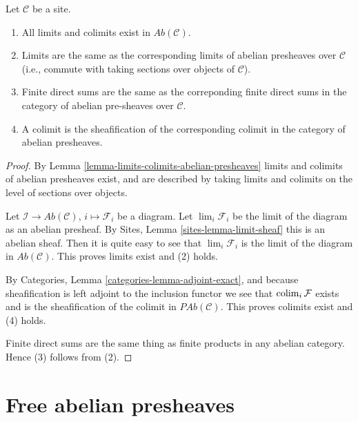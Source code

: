 \begin{lemma}
\label{lemma-limits-colimits-abelian-sheaves}
Let $\mathcal{C}$ be a site.
\begin{enumerate}
\item All limits and colimits exist in $\textit{Ab}(\mathcal{C})$.
\item Limits are the same as the corresponding limits of abelian presheaves
over $\mathcal{C}$ (i.e., commute with taking sections over objects of
$\mathcal{C}$).
\item Finite direct sums are the same as the correponding finite direct sums
in the category of abelian pre-sheaves over $\mathcal{C}$.
\item A colimit is the sheafification of the corresponding colimit in
the category of abelian presheaves.
\end{enumerate}
\end{lemma}

\begin{proof}
By Lemma \ref{lemma-limits-colimits-abelian-presheaves} limits and colimits
of abelian presheaves exist, and are described by taking limits and colimits
on the level of sections over objects.

\medskip\noindent
Let $\mathcal{I} \to \textit{Ab}(\mathcal{C})$, $i \mapsto \mathcal{F}_i$
be a diagram. Let $\lim_i \mathcal{F}_i$ be the limit of the diagram
as an abelian presheaf. By Sites, Lemma \ref{sites-lemma-limit-sheaf}
this is an abelian sheaf. Then it is quite easy to see that
$\lim_i \mathcal{F}_i$ is the limit of the diagram in
$\textit{Ab}(\mathcal{C})$. This proves limits exist and (2) holds.

\medskip\noindent
By Categories, Lemma \ref{categories-lemma-adjoint-exact}, and because
sheafification is left adjoint to the inclusion functor we see that
$\mathop{\rm colim}\nolimits_i \mathcal{F}$ exists and is the sheafification of the colimit
in $\textit{PAb}(\mathcal{C})$. This proves colimits exist and (4) holds.

\medskip\noindent
Finite direct sums are the same thing as finite products in any abelian
category. Hence (3) follows from (2).
\end{proof}







\section{Free abelian presheaves}
\label{section-free-abelian-presheaf}


